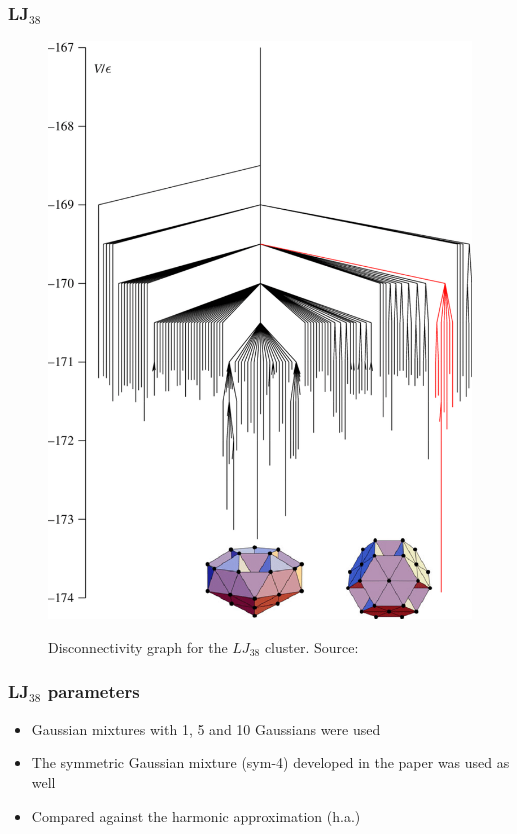 \documentclass{beamer}
\begin{document}
	\begin{frame}
		\frametitle{LJ$_{38}$}
		\begin{figure}
			\center
			\includegraphics[height=0.85\textheight]{figures/LJ38.png}
			\label{fig:LJ38_disc}
			\caption{Disconnectivity graph for the $LJ_{38}$ cluster. Source: \cite{Wales2005}}
		\end{figure}
	\end{frame}

	\begin{frame}
		\frametitle{LJ$_{38}$ parameters}
		\begin{itemize}
			\item Gaussian mixtures with 1, 5 and 10 Gaussians were used
			\item The symmetric Gaussian mixture (sym-4) developed in the paper was used as well
			\item Compared against the harmonic approximation (h.a.)

		\end{itemize}
	\end{frame}
\end{document}

